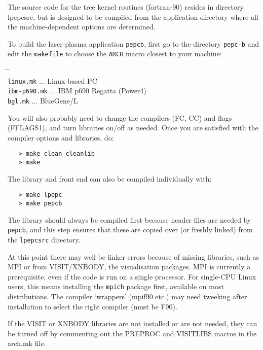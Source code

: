 \documentclass[12pt,psfig]{article}
\begin{document}
The source code for the tree kernel routines (fortran-90) resides in directory
lpepcsrc, but is designed to be compiled from the application directory where
all the machine-dependent options are determined.

\medskip\noindent
To build the laser-plasma application {\tt pepcb}, first go to the directory
{\tt pepc-b} and edit the {\tt makefile} to choose the {\tt ARCH} macro closest to your machine:

\begin{tabbing}
\hspace{1cm} \= \hspace{3cm} \= \hspace{1cm} \=\\
\> \texttt{linux.mk} \> ... \> Linux-based PC\\
\> \texttt{ibm-p690.mk} \> ... \> IBM p690 Regatta (Power4)\\
\> \texttt{bgl.mk} \> ... \> BlueGene/L 
\end{tabbing}

\noindent
You will also probably need to change the compilers (FC, CC) and flags
(FFLAGS1), and turn libraries on/off as needed.
Once you are satisfied with the compiler options and libraries, do:

\begin{verbatim}
   > make clean cleanlib
   > make
\end{verbatim}

\noindent
The library and front end can also be compiled individually with:
\begin{verbatim}
   > make lpepc
   > make pepcb
\end{verbatim}
 
\noindent
The library should always be compiled first because header files are needed by
{\tt pepcb}, and this step ensures that these are copied over (or freshly
linked) from the {\tt lpepcsrc} directory.

\medskip\noindent
At this point there may well be linker errors because of missing
libraries, such as MPI or from VISIT/XNBODY, the visualisation packages.  MPI is
currently a prerequisite, even if the code is run on a single processor.  For
single-CPU Linux users, this means installing the {\tt mpich} package first, available on
most distributions.  The compiler `wrappers' (mpif90 etc.) may need tweeking
after installation to select the right compiler (must be F90).

\medskip\noindent
If the VISIT or XNBODY libraries are not installed or are not needed, they can
be turned off by commenting out the PREPROC and VISITLIBS macros in the arch.mk file.
\end{document}
